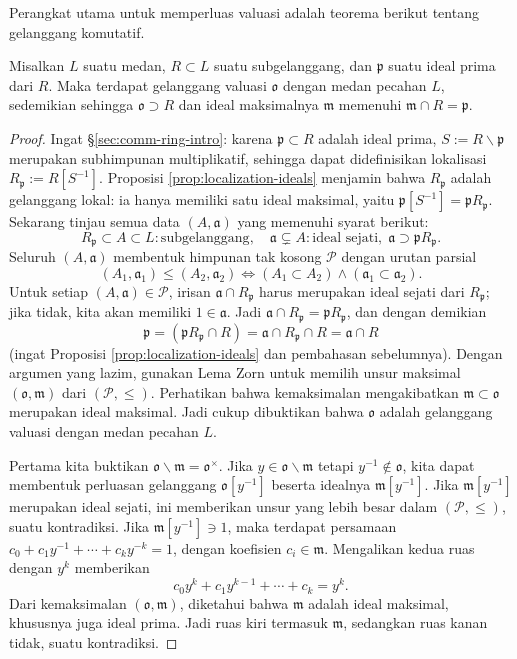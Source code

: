 Perangkat utama untuk memperluas valuasi adalah teorema berikut tentang gelanggang komutatif.
\begin{theorem}[C.\ Chevalley]\label{prop:Chevalley-extension}
	Misalkan $L$ suatu medan, $R \subset L$ suatu subgelanggang, dan $\mathfrak{p}$ suatu ideal prima dari $R$. Maka terdapat gelanggang valuasi $\mathfrak{o}$ dengan medan pecahan $L$, sedemikian sehingga $\mathfrak{o} \supset R$ dan ideal maksimalnya $\mathfrak{m}$ memenuhi $\mathfrak{m} \cap R = \mathfrak{p}$.
\end{theorem}
\begin{proof}
	Ingat \S\ref{sec:comm-ring-intro}: karena $\mathfrak{p} \subset R$ adalah ideal prima, $S := R \smallsetminus \mathfrak{p}$ merupakan subhimpunan multiplikatif, sehingga dapat didefinisikan lokalisasi $R_{\mathfrak{p}} := R[S^{-1}]$. Proposisi \ref{prop:localization-ideals} menjamin bahwa $R_{\mathfrak{p}}$ adalah gelanggang lokal: ia hanya memiliki satu ideal maksimal, yaitu $\mathfrak{p}[S^{-1}] = \mathfrak{p} R_{\mathfrak{p}}$. Sekarang tinjau semua data $(A, \mathfrak{a})$ yang memenuhi syarat berikut:
	\[ R_{\mathfrak{p}} \subset A \subset L: \text{subgelanggang}, \quad \mathfrak{a} \subsetneq A: \text{ideal sejati}, \; \mathfrak{a} \supset \mathfrak{p} R_{\mathfrak{p}}. \]
	Seluruh $(A, \mathfrak{a})$ membentuk himpunan tak kosong $\mathcal{P}$ dengan urutan parsial
	\[ (A_1, \mathfrak{a}_1) \leq (A_2, \mathfrak{a}_2) \iff (A_1 \subset A_2) \wedge (\mathfrak{a}_1 \subset \mathfrak{a}_2). \]
	Untuk setiap $(A, \mathfrak{a}) \in \mathcal{P}$, irisan $\mathfrak{a} \cap R_{\mathfrak{p}}$ harus merupakan ideal sejati dari $R_{\mathfrak{p}}$; jika tidak, kita akan memiliki $1 \in \mathfrak{a}$. Jadi $\mathfrak{a} \cap R_{\mathfrak{p}} = \mathfrak{p}R_{\mathfrak{p}}$, dan dengan demikian
	\[ \mathfrak{p} = (\mathfrak{p}R_{\mathfrak{p}} \cap R) = \mathfrak{a} \cap R_{\mathfrak{p}} \cap R = \mathfrak{a} \cap R \]
	(ingat Proposisi \ref{prop:localization-ideals} dan pembahasan sebelumnya). Dengan argumen yang lazim, gunakan Lema Zorn untuk memilih unsur maksimal $(\mathfrak{o}, \mathfrak{m})$ dari $(\mathcal{P}, \leq)$. Perhatikan bahwa kemaksimalan mengakibatkan $\mathfrak{m} \subset \mathfrak{o}$ merupakan ideal maksimal. Jadi cukup dibuktikan bahwa $\mathfrak{o}$ adalah gelanggang valuasi dengan medan pecahan $L$.

	Pertama kita buktikan $\mathfrak{o} \smallsetminus \mathfrak{m} = \mathfrak{o}^\times$. Jika $y \in \mathfrak{o} \smallsetminus \mathfrak{m}$ tetapi $y^{-1} \notin \mathfrak{o}$, kita dapat membentuk perluasan gelanggang $\mathfrak{o}[y^{-1}]$ beserta idealnya $\mathfrak{m}[y^{-1}]$. Jika $\mathfrak{m}[y^{-1}]$ merupakan ideal sejati, ini memberikan unsur yang lebih besar dalam $(\mathcal{P}, \leq)$, suatu kontradiksi. Jika $\mathfrak{m}[y^{-1}] \ni 1$, maka terdapat persamaan $c_0 + c_1 y^{-1} + \cdots + c_k y^{-k} = 1$, dengan koefisien $c_i \in \mathfrak{m}$. Mengalikan kedua ruas dengan $y^k$ memberikan
	\[ c_0 y^k + c_1 y^{k-1} + \cdots + c_k = y^k. \]
	Dari kemaksimalan $(\mathfrak{o}, \mathfrak{m})$, diketahui bahwa $\mathfrak{m}$ adalah ideal maksimal, khususnya juga ideal prima. Jadi ruas kiri termasuk $\mathfrak{m}$, sedangkan ruas kanan tidak, suatu kontradiksi.


\end{proof}
